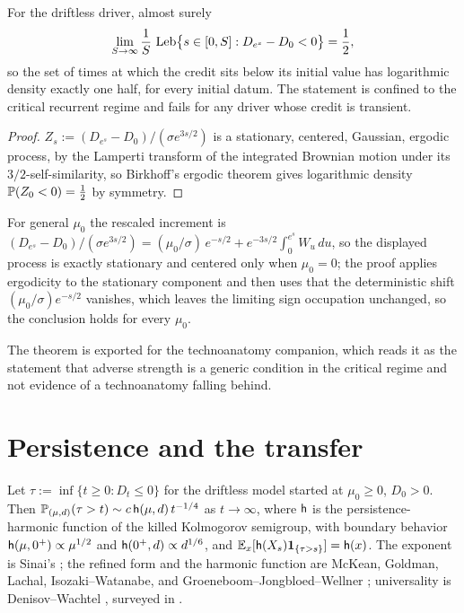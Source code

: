 \begin{theorem}\label{thm:half}
For the driftless driver, almost surely
\begin{equation}\label{eq:half}
\lim_{S\to\infty}\frac1S\,\operatorname{Leb}\bigl\{s\in[0,S]:D_{e^{s}}-D_0<0\bigr\}=\frac12,
\end{equation}
so the set of times at which the credit sits below its initial value
has logarithmic density exactly one half, for every initial datum. The
statement is confined to the critical recurrent regime and fails for
any driver whose credit is transient.
\end{theorem}

\begin{proof}
$Z_s:=(D_{e^{s}}-D_0)/(\sigma e^{3s/2})$ is a stationary, centered,
Gaussian, ergodic process, by the Lamperti transform of the integrated
Brownian motion under its $3/2$-self-similarity, so Birkhoff's ergodic
theorem gives logarithmic density $\mathbb{P}(Z_0<0)=\tfrac12$ by symmetry.
\end{proof} For general $\mu_0$ the rescaled increment is $(D_{e^s}-D_0)/(\sigma e^{3s/2}) = (\mu_0/\sigma)\,e^{-s/2} + e^{-3s/2}\int_0^{e^s}W_u\,du$, so the displayed process is exactly stationary and centered only when $\mu_0 = 0$; the proof applies ergodicity to the stationary component and then uses that the deterministic shift $(\mu_0/\sigma)e^{-s/2}$ vanishes, which leaves the limiting sign occupation unchanged, so the conclusion holds for every $\mu_0$.

\noindent The theorem is exported for the technoanatomy companion, which
reads it as the statement that adverse strength is a generic condition
in the critical regime and not evidence of a technoanatomy falling behind.

\section{Persistence and the transfer}\label{sec:persist}

\begin{theorem}
\label{thm:persist}
Let $\tau:=\inf\{t\ge0:D_t\le0\}$ for the driftless model started at
$\mu_0\ge0$, $D_0>0$. Then
$\mathbb{P}_{(\mu,d)}(\tau>t)\sim c\,\mathsf{h}(\mu,d)\,t^{-1/4}$ as $t\to\infty$,
where $\mathsf{h}$ is the persistence-harmonic function of the killed
Kolmogorov semigroup, with boundary behavior
$\mathsf{h}(\mu,0^+)\propto\mu^{1/2}$ and $\mathsf{h}(0^+,d)\propto d^{1/6}$, and
$\mathbb{E}_x[\mathsf{h}(X_s)\mathbf{1}_{\{\tau>s\}}]=\mathsf{h}(x)$. The exponent is Sinai's
\cite{Sin92}; the refined form and the harmonic function are
McKean, Goldman, Lachal, Isozaki--Watanabe, and
Groeneboom--Jongbloed--Wellner
\cite{McK63,Gol71,Lac91,IW94,GJW99}; universality is
Denisov--Wachtel \cite{DW15}, surveyed in \cite{AS15,BMS13}.
\end{theorem}

